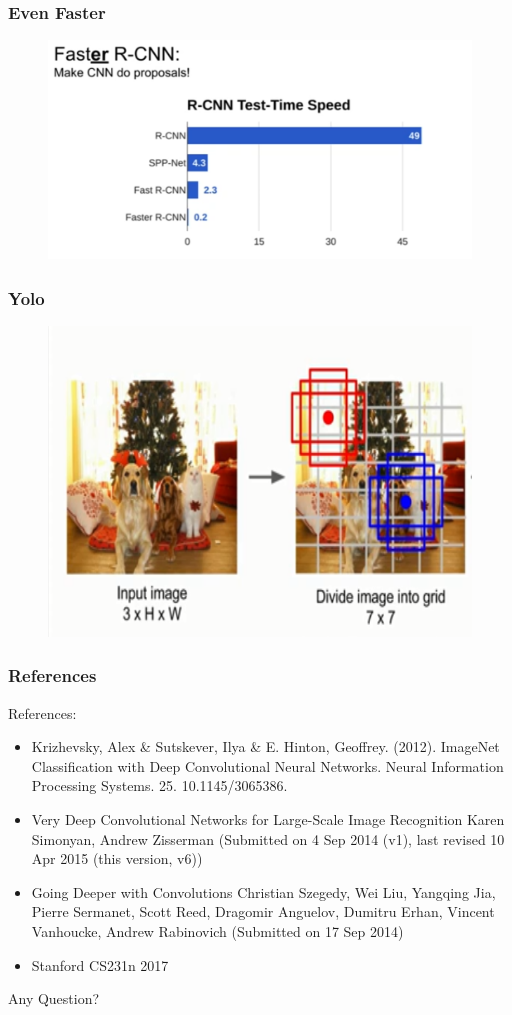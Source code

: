 \documentclass{beamer}
\begin{document}
\begin{frame}
\frametitle{Even Faster}

\begin{figure}
	\includegraphics[width=\linewidth]{Pics/fastercompare.png}
	
\end{figure}

\end{frame}

\begin{frame}
	\frametitle{Yolo}
	\begin{figure}
		\includegraphics[width= .8\linewidth]{Pics/yolo.PNG}
	\end{figure}
\end{frame}

\begin{frame}
\frametitle{References}
	References:
	\begin{itemize}
		\item
		Krizhevsky, Alex \& Sutskever, Ilya \& E. Hinton, Geoffrey. (2012). ImageNet Classification with Deep Convolutional Neural Networks. Neural Information Processing Systems. 25. 10.1145/3065386.
		\item
		Very Deep Convolutional Networks for Large-Scale Image Recognition
		Karen Simonyan, Andrew Zisserman
		(Submitted on 4 Sep 2014 (v1), last revised 10 Apr 2015 (this version, v6))
		\item
		Going Deeper with Convolutions
		Christian Szegedy, Wei Liu, Yangqing Jia, Pierre Sermanet, Scott Reed, Dragomir Anguelov, Dumitru Erhan, Vincent Vanhoucke, Andrew Rabinovich
		(Submitted on 17 Sep 2014)
		\item Stanford CS231n 2017
	\end{itemize}
\end{frame}

\begin{frame}
\Huge
\centering
Any Question?
\end{frame}
\end{document}
